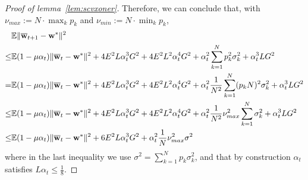 \begin{proof}[Proof of lemma~\ref{lem:scvxoner}]
	Therefore, we can conclude that, with $\nu_{max}:=N\cdot\max_{k}p_{k}$ and $\nu_{min}:=N\cdot\min_{k}p_{k}$, 
	\begin{align*}
	& \mathbb{E}\|{\overline{\mathbf{w}}}_{t+1}-{\mathbf{w}}^{\ast}\|^{2}\\
	\leq& \mathbb{E}(1-\mu\alpha_{t})\|{\overline{\mathbf{w}}}_{t}-{\mathbf{w}}^{\ast}\|^{2}+4E^{2}L\alpha_{t}^{3}G^{2}+4E^{2}L^{2}\alpha_{t}^{4}G^{2}+\alpha_{t}^{2}\sum_{k=1}^{N}p_{k}^{2}\sigma_{k}^{2}+\alpha_{t}^{3}LG^{2}\\
	= &\mathbb{E}(1-\mu\alpha_{t})\|{\overline{\mathbf{w}}}_{t}-{\mathbf{w}}^{\ast}\|^{2}+4E^{2}L\alpha_{t}^{3}G^{2}+4E^{2}L^{2}\alpha_{t}^{4}G^{2}+\alpha_{t}^{2}\frac{1}{N^{2}}\sum_{k=1}^{N}(p_{k}N)^{2}\sigma_{k}^{2}+\alpha_{t}^{3}LG^{2}\\
	\leq &\mathbb{E}(1-\mu\alpha_{t})\|{\overline{\mathbf{w}}}_{t}-{\mathbf{w}}^{\ast}\|^{2}+4E^{2}L\alpha_{t}^{3}G^{2}+4E^{2}L^{2}\alpha_{t}^{4}G^{2}+\alpha_{t}^{2}\frac{1}{N^{2}}\nu_{max}^{2}\sum_{k=1}^{N}\sigma_{k}^{2}+\alpha_{t}^{3}LG^{2}\\
	\leq &\mathbb{E}(1-\mu\alpha_{t})\|{\overline{\mathbf{w}}}_{t}-{\mathbf{w}}^{\ast}\|^{2}+6E^{2}L\alpha_{t}^{3}G^{2}+\alpha_{t}^{2}\frac{1}{N}\nu_{max}^{2}\sigma^{2}
	\end{align*}
	where in the last inequality we use $\sigma^2=\sum_{k=1}^{N}p_k\sigma_{k}^{2}$, and that by construction $\alpha_{t}$
	satisfies $L\alpha_{t}\leq\frac{1}{8}$. 

\end{proof}


